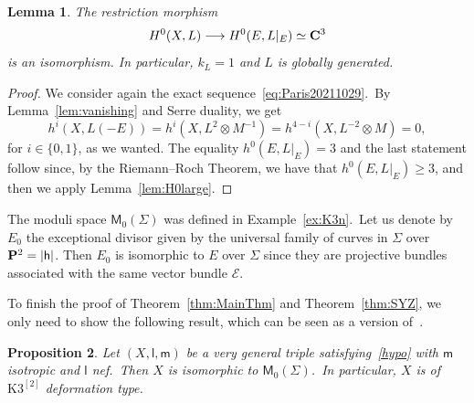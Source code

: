 \documentclass[12pt]{amsart}
\def\cE{\mathscr{E}}
\def\C{{\bf C}}
\def\P{{\bf P}}
\def\otp{}
\def\isom{\simeq}
\def\lra{\longrightarrow}
\newtheorem{lemm}{Lemma}[section]
\newtheorem{prop}[lemm]{Proposition}
\theoremstyle{remark}
\def\hh{\ensuremath{\mathsf h}}
\def\lll{\ensuremath{\mathsf l}}
\def\mm{\ensuremath{\mathsf m}}
\def\M{\ensuremath{\mathsf M}}
\begin{document}
\begin{lemm}\label{lem:k=1}
The restriction morphism
\[
H^0(X,L)\lra H^0(E, L \vert_E) \isom \C^3
\]
is an isomorphism.
In particular, $k_L=1$ and $L$ is globally generated.
\end{lemm}

\begin{proof}
We consider again the exact sequence~\eqref{eq:Paris20211029}.\
By Lemma~\ref{lem:vanishing} and Serre duality, we get
\[
h^i(X,L (-E)) = h^i(X,L^{\otp 2}\otimes M^{-1})=h^{4-i}(X, L^{-2}\otimes M)=0,
\]
for $i\in\{0,1\}$, as we wanted.
The equality $h^0(E, L \vert_E)=3$ and the last statement follow since, by the Riemann--Roch Theorem, we have that $h^0(E, L \vert_E)\geq 3$, and then we apply Lemma~\ref{lem:H0large}.
\end{proof}

The moduli space $\M_0(\Sigma)$ was defined in Example~\ref{ex:K3n}.\
Let us denote by $E_0$ the exceptional divisor given by the universal family of curves in $\Sigma$ over $\P^2=|\hh |$.
Then $E_0$ is isomorphic to $ E$ over $\Sigma$ since they are projective bundles associated with  the same vector bundle $\cE$.

To finish the proof of Theorem~\ref{thm:MainThm} and Theorem~\ref{thm:SYZ}, we only need to show the following result, which can be seen as a version of~\cite[Theorem 1]{nag}.

\begin{prop}\label{thm:OGrady}
Let $(X,\lll,\mm)$ be a very general triple satisfying~\eqref{hypo} with $\mm$ isotropic and $\lll$ nef.\
Then $X$ is isomorphic to $\M_0(\Sigma)$.\
In particular, $X$ is of $\mathrm{K3}^{[2]}$ deformation type.
\end{prop}
\end{document}
